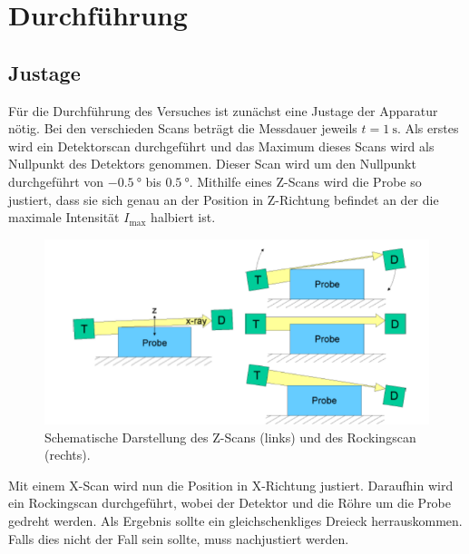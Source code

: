 \section{Durchführung}
\label{sec:Durchführung}
\subsection{Justage}
Für die Durchführung des Versuches ist zunächst eine Justage der Apparatur nötig. Bei den verschieden Scans beträgt die Messdauer jeweils $t=\SI{1}{\second}$. Als erstes wird ein Detektorscan durchgeführt und das Maximum dieses Scans wird als Nullpunkt des Detektors genommen. Dieser Scan wird um den Nullpunkt durchgeführt von $\SI{-0.5}{\degree}$ bis $\SI{0.5}{\degree}$. Mithilfe eines Z-Scans wird die Probe so justiert, dass sie sich genau an der Position in Z-Richtung befindet an der die maximale Intensität $I_\mathrm{max}$ halbiert ist.
\begin{figure}[h!]
  \centering
  \includegraphics[scale=0.6]{fig/zscan.png}
  \caption{Schematische Darstellung des Z-Scans (links) und des Rockingscan (rechts). \cite[5]{Anleitung4}}
  \label{fig:zscanbei}
\end{figure}
\FloatBarrier
\noindent Mit einem X-Scan wird nun die Position in X-Richtung justiert.
Daraufhin wird ein Rockingscan durchgeführt, wobei der Detektor und die Röhre um die Probe gedreht werden. Als Ergebnis sollte ein gleichschenkliges Dreieck herrauskommen. Falls dies nicht der Fall sein sollte, muss nachjustiert werden.

